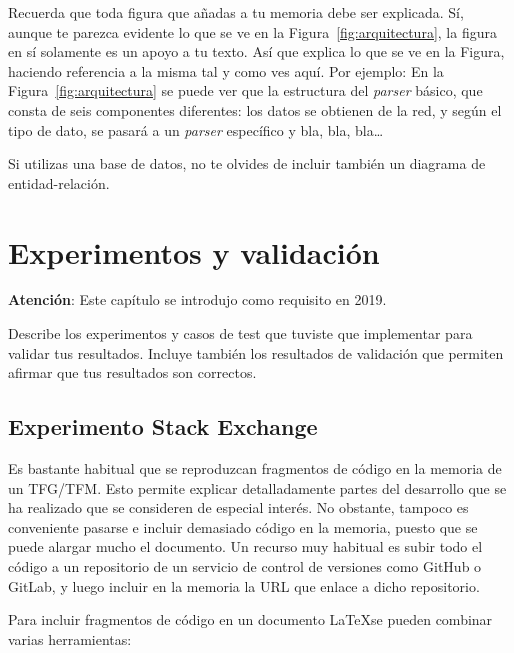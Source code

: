 \documentclass[a4paper, 12pt]{book}
\begin{document}
 
Recuerda que toda figura que añadas a tu memoria debe ser explicada.
Sí, aunque te parezca evidente lo que se ve en la Figura~\ref{fig:arquitectura}, la figura en sí solamente es un apoyo a tu texto.
Así que explica lo que se ve en la Figura, haciendo referencia a la misma tal y como ves aquí.
Por ejemplo: En la Figura~\ref{fig:arquitectura} se puede ver que la estructura del \emph{parser} básico, que consta de seis componentes diferentes: los datos se obtienen de la red, y según el tipo de dato, se pasará a un \emph{parser} específico y bla, bla, bla\ldots

Si utilizas una base de datos, no te olvides de incluir también un diagrama de entidad-relación.

\cleardoublepage


\chapter{Experimentos y validación}
\label{chap:experimentos}

\textbf{Atención}: Este capítulo se introdujo como requisito en 2019.

Describe los experimentos y casos de test que tuviste que implementar para validar tus resultados. 
Incluye también los resultados de validación que permiten afirmar que tus resultados son correctos.

\section{Experimento Stack Exchange}
\label{chap:exper_stack}

Es bastante habitual que se reproduzcan fragmentos de código en la memoria de un TFG/TFM.
Esto permite explicar detalladamente partes del desarrollo que se ha realizado que se consideren
de especial interés. No obstante, tampoco es conveniente pasarse e incluir demasiado código en
la memoria, puesto que se puede alargar mucho el documento. Un recurso muy habitual es subir
todo el código a un repositorio de un servicio de control de versiones como GitHub o GitLab,
y luego incluir en la memoria la URL que enlace a dicho repositorio.

Para incluir fragmentos de código en un documento \LaTeX se pueden combinar varias
herramientas:
\end{document}
